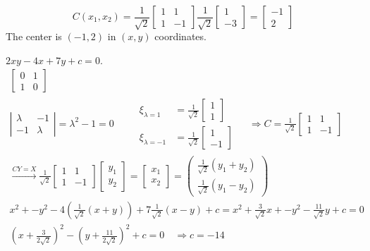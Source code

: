 \documentclass[twoside]{amsart}
\theoremstyle{plain}
\theoremstyle{definition}
\newcommand{\exercisehead}[1]
  {
   \noindent{\small\bf Exercise #1.}
   \smallskip}
\begin{document}
\[
C (x_1, x_2) = \frac{1}{\sqrt{2}} \left[ \begin{matrix} 1 & 1 \\ 1 & -1 \end{matrix} \right] \frac{1}{\sqrt{2}} \left[ \begin{matrix} 1 \\ -3 \end{matrix} \right] = \left[ \begin{matrix} -1 \\ 2 \end{matrix} \right]
\]
The center is $(-1,2)$ in $(x,y)$ coordinates.  

\exercisehead{19} $2xy - 4x + 7y + c =0$.  
\[
\begin{gathered}
  \left[ \begin{matrix} 0 & 1 \\ 1 & 0 \end{matrix} \right] \\
  \left| \begin{matrix} \lambda & -1 \\ -1 & \lambda \end{matrix} \right| = \lambda^2 - 1 = 0 \quad \quad \, \begin{aligned} \xi_{\lambda = 1} & = \frac{1}{\sqrt{2}} \left[ \begin{matrix} 1 \\ 1 \end{matrix} \right] \\ \xi_{\lambda = -1} & = \frac{1}{\sqrt{2}} \left[ \begin{matrix} 1 \\ -1 \end{matrix} \right] \end{aligned} \quad \,   \Longrightarrow C = \frac{1}{\sqrt{2}} \left[ \begin{matrix} 1 & 1 \\ 1 & -1 \end{matrix} \right] \\
  \xrightarrow{ CY = X} \frac{1}{\sqrt{2}} \left[ \begin{matrix} 1 & 1 \\ 1 & -1 \end{matrix} \right] \left[ \begin{matrix} y_1 \\ y_2 \end{matrix} \right] = \left[ \begin{matrix} x_1 \\ x_2 \end{matrix} \right] = \left( \begin{matrix} \frac{1}{\sqrt{2}} (y_1 + y_2) \\ \frac{1}{\sqrt{2}} (y_1 - y_2) \end{matrix} \right) \\ 
x^2 + - y^2 - 4 \left( \frac{1}{\sqrt{2}} (x+y)\right) + 7 \frac{1}{\sqrt{2}} (x-y) + c = x^2 + \frac{3}{\sqrt{2}} x + - y^2 - \frac{11}{\sqrt{2}} y + c = 0 \\
\left( x+ \frac{3}{2 \sqrt{2}} \right)^2 - \left( y + \frac{11}{2 \sqrt{2}} \right)^2 + c =0 \quad \Longrightarrow \boxed{ c = -14 }
\end{gathered}
\]
\end{document}
